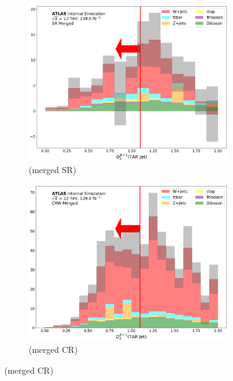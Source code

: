  \begin{figure}[htbp] \ContinuedFloat
   \begin{subfigure}{0.45\textwidth}
     \includegraphics[width = 0.95\textwidth]{Figures/App_SR_CR_distributions/SR1L_Merged/TARJets10_TAR_D20_N_1.pdf}
    \caption{\DtwoTAR (merged SR)}
     \end{subfigure}
    \begin{subfigure}{0.45\textwidth}
     \includegraphics[width = 0.95\textwidth]{Figures/App_SR_CR_distributions/CRW_Merged/TARJets10_TAR_D20_N_1.pdf}
     \caption{\DtwoTAR (merged \wjets CR)}
     \end{subfigure}


\end{figure}
